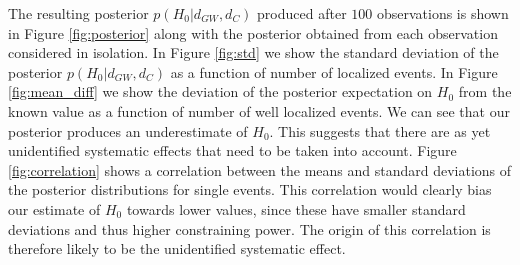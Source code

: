 The resulting posterior $p(H_0 | d_{GW}, d_C)$ produced after $100$ observations is shown in Figure \ref{fig:posterior} along with the posterior obtained from each observation considered in isolation.
In Figure \ref{fig:std} we show the standard deviation of the posterior $p(H_0 | d_{GW}, d_C)$ as a function of number of localized events.
In Figure \ref{fig:mean_diff} we show the deviation of the posterior expectation on $H_0$ from the known value as a function of number of well localized events.
We can see that our posterior produces an underestimate of $H_0$.
This suggests that there are as yet unidentified systematic effects that need to be taken into account.
Figure \ref{fig:correlation} shows a correlation between the means and standard deviations of the posterior distributions for single events.
This correlation would clearly bias our estimate of $H_0$ towards lower values, since these have smaller standard deviations and thus higher constraining power.
The origin of this correlation is therefore likely to be the unidentified systematic effect.
